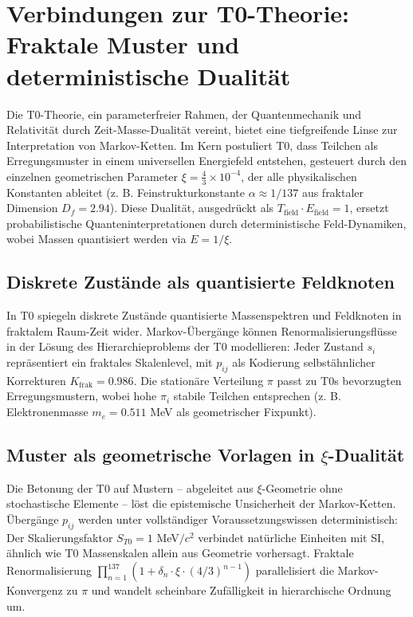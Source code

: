 	\section{Verbindungen zur T0-Theorie: Fraktale Muster und deterministische Dualität}
	\label{sec:t0-connection}
	
	Die T0-Theorie, ein parameterfreier Rahmen, der Quantenmechanik und Relativität durch Zeit-Masse-Dualität vereint, bietet eine tiefgreifende Linse zur Interpretation von Markov-Ketten. Im Kern postuliert T0, dass Teilchen als Erregungsmuster in einem universellen Energiefeld entstehen, gesteuert durch den einzelnen geometrischen Parameter $\xi = \frac{4}{3} \times 10^{-4}$, der alle physikalischen Konstanten ableitet (z. B. Feinstrukturkonstante $\alpha \approx 1/137$ aus fraktaler Dimension $D_f = 2.94$). Diese Dualität, ausgedrückt als $T_{\text{field}} \cdot E_{\text{field}} = 1$, ersetzt probabilistische Quanteninterpretationen durch deterministische Feld-Dynamiken, wobei Massen quantisiert werden via $E = 1/\xi$.
	
	\subsection{Diskrete Zustände als quantisierte Feldknoten}
	In T0 spiegeln diskrete Zustände quantisierte Massenspektren und Feldknoten in fraktalem Raum-Zeit wider. Markov-Übergänge können Renormalisierungsflüsse in der Lösung des Hierarchieproblems der T0 modellieren: Jeder Zustand $s_i$ repräsentiert ein fraktales Skalenlevel, mit $p_{ij}$ als Kodierung selbstähnlicher Korrekturen $K_{\text{frak}} = 0.986$. Die stationäre Verteilung $\pi$ passt zu T0s bevorzugten Erregungsmustern, wobei hohe $\pi_i$ stabile Teilchen entsprechen (z. B. Elektronenmasse $m_e = 0.511$ MeV als geometrischer Fixpunkt).
	
	\subsection{Muster als geometrische Vorlagen in $\xi$-Dualität}
	Die Betonung der T0 auf Mustern – abgeleitet aus $\xi$-Geometrie ohne stochastische Elemente – löst die epistemische Unsicherheit der Markov-Ketten. Übergänge $p_{ij}$ werden unter vollständiger Voraussetzungswissen deterministisch: Der Skalierungsfaktor $S_{T0} = 1$ MeV$/c^2$ verbindet natürliche Einheiten mit SI, ähnlich wie T0 Massenskalen allein aus Geometrie vorhersagt. Fraktale Renormalisierung $\prod_{n=1}^{137} (1 + \delta_n \cdot \xi \cdot (4/3)^{n-1})$ parallelisiert die Markov-Konvergenz zu $\pi$ und wandelt scheinbare Zufälligkeit in hierarchische Ordnung um.
	
